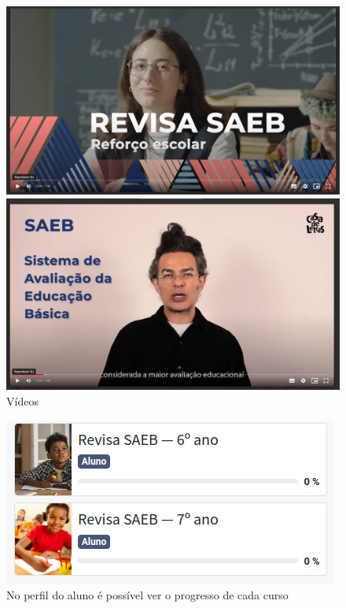 \begin{figure}
\includegraphics[width=\textwidth]{imgs/video1}\bigskip

\includegraphics[width=\textwidth]{imgs/video-2}
\caption{Vídeos}
\end{figure}



\begin{figure}
\includegraphics[width=\textwidth]{imgs/progresso}
\caption{No perfil do aluno é possível ver o progresso de cada curso}
\end{figure}


